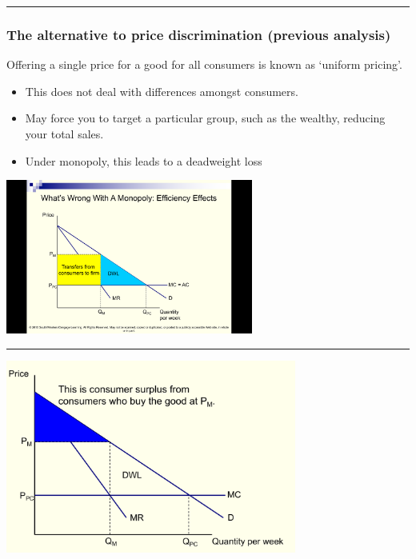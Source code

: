 \documentclass[]{article}
\providecommand{\tightlist}{%
  \setlength{\itemsep}{0pt}\setlength{\parskip}{0pt}}
\begin{document}
\begin{center}\rule{0.5\linewidth}{\linethickness}\end{center}

\hypertarget{the-alternative-to-price-discrimination-previous-analysis}{%
\subsubsection{The alternative to price discrimination (previous analysis)}\label{the-alternative-to-price-discrimination-previous-analysis}}

Offering a single price for a good for all consumers is known as `uniform pricing'.

\begin{itemize}
\tightlist
\item
  This does not deal with differences amongst consumers.
\item
  May force you to target a particular group, such as the wealthy, reducing your total sales.
\item
  Under monopoly, this leads to a deadweight loss
\end{itemize}

\includegraphics[height=2in]{picsfigs/dwl3.png}

\begin{center}\rule{0.5\linewidth}{\linethickness}\end{center}

\includegraphics[height=2.5in]{picsfigs/ppd1.png}
\end{document}

